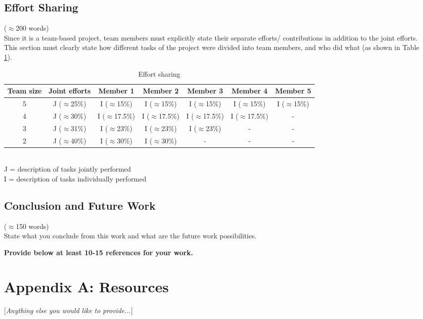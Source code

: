 \documentclass[12pt]{article}
\begin{document}
\section{Effort Sharing}\label{chap:conclusion}
($\approx$200 words)\\
Since it is a team-based project, team members must explicitly state their separate efforts/ contributions in addition to the joint efforts. This section must clearly state how different tasks of the project were divided into  team members, and who did what (as shown in Table \ref{tab:effortsharing}). 
\begin{table}[h]
\begin{center}
\caption{Effort sharing}\label{tab:effortsharing}
\begin{tabular}{|c|c|c|c|c|c|c|}
\hline
Team size & Joint efforts & Member 1 & Member 2 & Member 3 & Member 4 & Member 5\\
\hline
5 & J ($\approx$25\%) & I ($\approx$15\%) & I ($\approx$15\%) & I ($\approx$15\%) & I ($\approx$15\%) & I ($\approx$15\%)\\
4 & J ($\approx$30\%) & I ($\approx$17.5\%) & I ($\approx$17.5\%) & I ($\approx$17.5\%) & I ($\approx$17.5\%) & -\\
3 & J ($\approx$31\%) & I ($\approx$23\%) & I ($\approx$23\%) & I ($\approx$23\%) & - & -\\
2 & J ($\approx$40\%) & I ($\approx$30\%) & I ($\approx$30\%) & - & - & -\\
\hline
\end{tabular}\\
J = description of tasks jointly performed\\
I = description of tasks individually performed
\end{center}
\end{table}


\section{Conclusion and Future Work}\label{chap:conclusion}
($\approx$150 words)\\
State what you conclude from this work and what are the future work possibilities.


\textbf{Provide below at least 10-15 references for your work.}



\pagebreak

\chapter*{Appendix A: Resources}
[\textit{Anything else you would like to provide...}]
\end{document}
